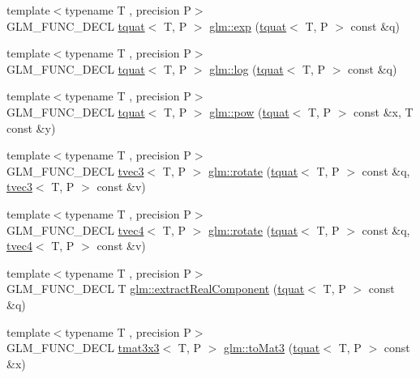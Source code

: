 \begin{DoxyCompactItemize}
\item 
{\footnotesize template$<$typename T , precision P$>$ }\\G\+L\+M\+\_\+\+F\+U\+N\+C\+\_\+\+D\+E\+CL \hyperlink{structglm_1_1tquat}{tquat}$<$ T, P $>$ \hyperlink{group__gtx__quaternion_ga17295173d4c2b5ae49b84e9993b63a62}{glm\+::exp} (\hyperlink{structglm_1_1tquat}{tquat}$<$ T, P $>$ const \&q)
\item 
{\footnotesize template$<$typename T , precision P$>$ }\\G\+L\+M\+\_\+\+F\+U\+N\+C\+\_\+\+D\+E\+CL \hyperlink{structglm_1_1tquat}{tquat}$<$ T, P $>$ \hyperlink{group__gtx__quaternion_ga791f42e134bfe97fc9c96f4668dd7489}{glm\+::log} (\hyperlink{structglm_1_1tquat}{tquat}$<$ T, P $>$ const \&q)
\item 
{\footnotesize template$<$typename T , precision P$>$ }\\G\+L\+M\+\_\+\+F\+U\+N\+C\+\_\+\+D\+E\+CL \hyperlink{structglm_1_1tquat}{tquat}$<$ T, P $>$ \hyperlink{group__gtx__quaternion_ga42a0cf206c59eaeff4c67dd62e09a580}{glm\+::pow} (\hyperlink{structglm_1_1tquat}{tquat}$<$ T, P $>$ const \&x, T const \&y)
\item 
{\footnotesize template$<$typename T , precision P$>$ }\\G\+L\+M\+\_\+\+F\+U\+N\+C\+\_\+\+D\+E\+CL \hyperlink{structglm_1_1tvec3}{tvec3}$<$ T, P $>$ \hyperlink{group__gtx__quaternion_ga9f39f0d3ecd66839a4af44560aa10fb2}{glm\+::rotate} (\hyperlink{structglm_1_1tquat}{tquat}$<$ T, P $>$ const \&q, \hyperlink{structglm_1_1tvec3}{tvec3}$<$ T, P $>$ const \&v)
\item 
{\footnotesize template$<$typename T , precision P$>$ }\\G\+L\+M\+\_\+\+F\+U\+N\+C\+\_\+\+D\+E\+CL \hyperlink{structglm_1_1tvec4}{tvec4}$<$ T, P $>$ \hyperlink{group__gtx__quaternion_ga96575f8868b3f2aa3e13cab9b94ccbd3}{glm\+::rotate} (\hyperlink{structglm_1_1tquat}{tquat}$<$ T, P $>$ const \&q, \hyperlink{structglm_1_1tvec4}{tvec4}$<$ T, P $>$ const \&v)
\item 
{\footnotesize template$<$typename T , precision P$>$ }\\G\+L\+M\+\_\+\+F\+U\+N\+C\+\_\+\+D\+E\+CL T \hyperlink{group__gtx__quaternion_ga90de879d97487ec804522dd418e5d8a0}{glm\+::extract\+Real\+Component} (\hyperlink{structglm_1_1tquat}{tquat}$<$ T, P $>$ const \&q)
\item 
{\footnotesize template$<$typename T , precision P$>$ }\\G\+L\+M\+\_\+\+F\+U\+N\+C\+\_\+\+D\+E\+CL \hyperlink{structglm_1_1tmat3x3}{tmat3x3}$<$ T, P $>$ \hyperlink{group__gtx__quaternion_ga01935b66ba245c2fd7dee5427d86ce9b}{glm\+::to\+Mat3} (\hyperlink{structglm_1_1tquat}{tquat}$<$ T, P $>$ const \&x)

\end{DoxyCompactItemize}

